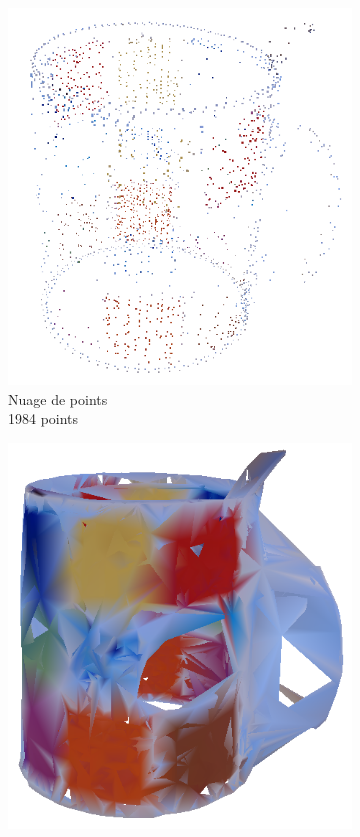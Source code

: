 \documentclass[a4paper,10pt]{report}
\begin{document}
\begin{figure}[h!]
	\centering
    \begin{subfigure}[b]{0.3\textwidth}
	    \includegraphics[width=\textwidth]{results/defaults-pointcloud.png}
        \caption{Nuage de points\\1984 points}
    \end{subfigure}
    \begin{subfigure}[b]{0.3\textwidth}
	    \includegraphics[width=\textwidth]{results/defaults-ipd.png}

\end{subfigure}
\end{figure}
\end{document}
